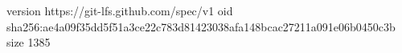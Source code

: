 version https://git-lfs.github.com/spec/v1
oid sha256:ae4a09f35dd5f51a3ce22c783d81423038afa148bcac27211a091e06b0450c3b
size 1385
